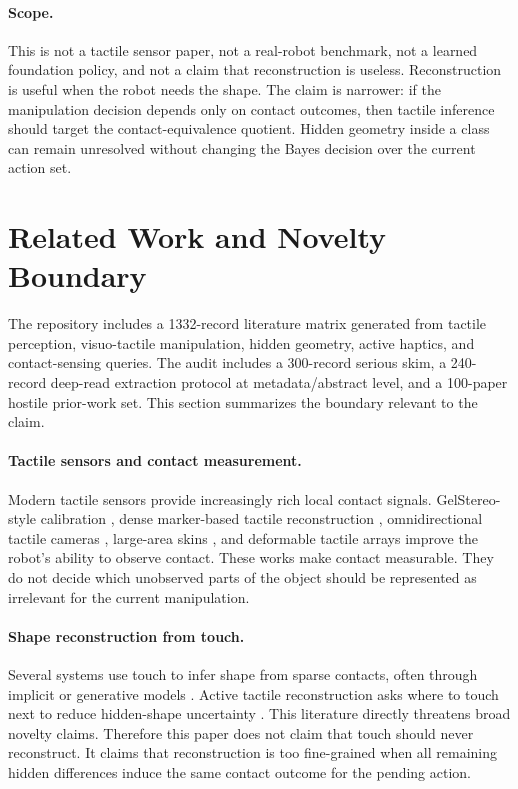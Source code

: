 \documentclass{article}
\begin{document}
\paragraph{Scope.}
This is not a tactile sensor paper, not a real-robot benchmark, not a learned foundation policy, and not a claim that reconstruction is useless. Reconstruction is useful when the robot needs the shape. The claim is narrower: if the manipulation decision depends only on contact outcomes, then tactile inference should target the contact-equivalence quotient. Hidden geometry inside a class can remain unresolved without changing the Bayes decision over the current action set.

\section{Related Work and Novelty Boundary}

The repository includes a 1332-record literature matrix generated from tactile perception, visuo-tactile manipulation, hidden geometry, active haptics, and contact-sensing queries. The audit includes a 300-record serious skim, a 240-record deep-read extraction protocol at metadata/abstract level, and a 100-paper hostile prior-work set. This section summarizes the boundary relevant to the claim.

\paragraph{Tactile sensors and contact measurement.}
Modern tactile sensors provide increasingly rich local contact signals. GelStereo-style calibration \citep{zhang2023gelstereo}, dense marker-based tactile reconstruction \citep{xue2023dense}, omnidirectional tactile cameras \citep{tippur2023gelsight360}, large-area skins \citep{hu2024magnetic}, and deformable tactile arrays \citep{jiang2024stretchable} improve the robot's ability to observe contact. These works make contact measurable. They do not decide which unobserved parts of the object should be represented as irrelevant for the current manipulation.

\paragraph{Shape reconstruction from touch.}
Several systems use touch to infer shape from sparse contacts, often through implicit or generative models \citep{tahoun2021visual,comi2024touchsdf,zhang2025diffusion,gu2026touchanything}. Active tactile reconstruction asks where to touch next to reduce hidden-shape uncertainty \citep{ottenhaus2018active,oikonomou2025proactive}. This literature directly threatens broad novelty claims. Therefore this paper does not claim that touch should never reconstruct. It claims that reconstruction is too fine-grained when all remaining hidden differences induce the same contact outcome for the pending action.
\end{document}
